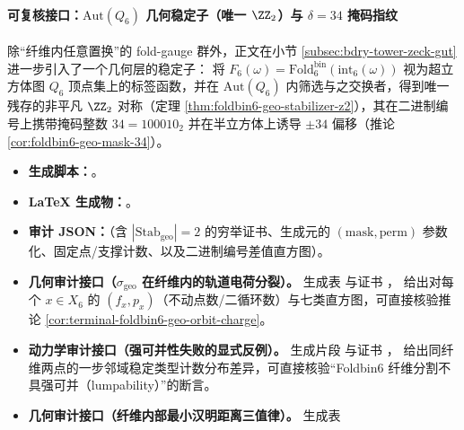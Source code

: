 \paragraph{可复核接口：\texorpdfstring{$\mathrm{Aut}(Q_6)$}{Aut(Q6)} 几何稳定子（唯一 \texorpdfstring{$\ZZ_2$}{Z2}）与 \texorpdfstring{$\delta=34$}{δ=34} 掩码指纹}
除“纤维内任意置换”的 fold-gauge 群外，正文在小节 \ref{subsec:bdry-tower-zeck-gut} 进一步引入了一个几何层的稳定子：
将 \(F_6(\omega)=\mathrm{Fold}^{\mathrm{bin}}_6(\mathrm{int}_6(\omega))\) 视为超立方体图 \(Q_6\) 顶点集上的标签函数，并在 \(\mathrm{Aut}(Q_6)\) 内筛选与之交换者，得到唯一残存的非平凡 \(\ZZ_2\) 对称（定理 \ref{thm:foldbin6-geo-stabilizer-z2}），其在二进制编号上携带掩码整数 \(34=100010_2\) 并在半立方体上诱导 \(\pm 34\) 偏移（推论 \ref{cor:foldbin6-geo-mask-34}）。
\begin{itemize}
  \item \textbf{生成脚本：}\texttt{}。
  \item \textbf{LaTeX 生成物：}\texttt{}。
  \item \textbf{审计 JSON：}\texttt{}（含 \(|\mathrm{Stab}_{\mathrm{geo}}|=2\) 的穷举证书、生成元的 \((\mathrm{mask},\mathrm{perm})\) 参数化、固定点/支撑计数、以及二进制编号差值直方图）。
  \item \textbf{几何审计接口（\(\sigma_{\mathrm{geo}}\) 在纤维内的轨道电荷分裂）。}
  \texttt{} 生成表
  \texttt{}
  与证书 \texttt{}，
  给出对每个 \(x\in X_6\) 的 \((f_x,p_x)\)（不动点数/二循环数）与七类直方图，可直接核验推论 \ref{cor:terminal-foldbin6-geo-orbit-charge}。
  \item \textbf{动力学审计接口（强可并性失败的显式反例）。}
   生成片段
  \texttt{}
  与证书 \texttt{}，
  给出同纤维两点的一步邻域稳定类型计数分布差异，可直接核验“Foldbin6 纤维分割不具强可并（lumpability）”的断言。
  \item \textbf{几何审计接口（纤维内部最小汉明距离三值律）。}
   生成表

\end{itemize}
